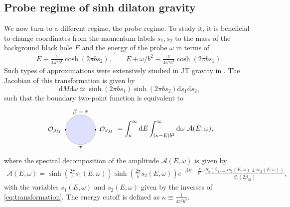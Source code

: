 \documentclass[a4paper,titlepage,12pt]{article}
\numberwithin{equation}{section}
\begin{document}
\subsection{Probe regime of sinh dilaton gravity}
\label{s:probe}

We now turn to a different regime, the probe regime.
To study it, it is beneficial to change coordinates from the momentum labels $s_1,s_2$ to the mass of the background black hole $E$ and the energy of the probe $\omega$ in terms of 
\begin{align}
\label{eq:transformation}
          E \equiv \frac{1}{4\pi^2b^4}\cosh(2\pi bs_2), \qquad E+\omega/b^2 \equiv \frac{1}{4\pi^2b^4} \cosh(2\pi bs_1).
\end{align} 
Such types of approximations were extensively studied in JT gravity in \cite{Lam:2018pvp}. The Jacobian of this transformation is given by 
\begin{equation}\mathrm{d}M \mathrm{d}\omega\simeq \sinh(2\pi bs_1)\sinh(2\pi bs_2)\mathrm{d}s_1 \mathrm{d}s_2,
\end{equation}
such that the boundary two-point function is equivalent to 
\begin{align}
    \begin{tikzpicture}[baseline={([yshift=-.5ex]current bounding box.center)}, scale=0.5]
\draw[fill=blue!40!white,opacity=0.3] (0,0) ellipse (1.5 and 1.5);
\draw[fill] (-1.5,0) circle (0.06);
\draw[fill] (1.5,0) circle (0.06); 
\node at (-2.6,0) {\small $\mathcal{O}_{\beta_M}$};
\node at (2.6,0) {\small $\mathcal{O}_{\beta_M}$};
\node at (0,-1.8) {\small $\tau$};
\node at (0,1.8) {\small $\beta-\tau$};
\end{tikzpicture}
    =\int_\kappa^\infty \mathrm{d}E\int_{(\kappa-E)b^2}^\infty \mathrm{d}\omega \ \mathcal{A}(E,\omega),
\end{align} 
where the spectral decomposition of the amplitude $\mathcal{A}(E,\omega)$ is given by
\begin{align}
\label{eq:start}
\mathcal{A}(E,\omega)=\sinh\left(\frac{2\pi}{b}s_1 (E,\omega)\right)\sinh\left(\frac{2\pi}{b}s_2 (E,\omega)\right)e^{-\beta E-\frac{\tau}{b^2}\omega}\frac{S_b\left(\beta_M\pm i s_1 (E,\omega)\pm i s_2 (E,\omega)\right)}{S_b(2\beta_M)},
\end{align} 
with the variables $s_1 (E,\omega)$ and $s_2 (E,\omega)$ given by the inverses of \eqref{eq:transformation}. The energy cutoff is defined as $\kappa\equiv \frac{1}{4\pi^2b^4}$. 
\end{document}
